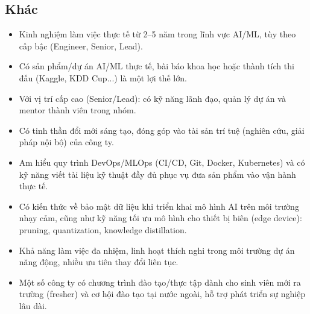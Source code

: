 \subsection{Khác}
\begin{itemize}
    \item Kinh nghiệm làm việc thực tế từ 2--5 năm trong lĩnh vực AI/ML, tùy theo cấp bậc (Engineer, Senior, Lead).
    \item Có sản phẩm/dự án AI/ML thực tế, bài báo khoa học hoặc thành tích thi đấu (Kaggle, KDD Cup...) là một lợi thế lớn.
    \item Với vị trí cấp cao (Senior/Lead): có kỹ năng lãnh đạo, quản lý dự án và mentor thành viên trong nhóm.
    \item Có tinh thần đổi mới sáng tạo, đóng góp vào tài sản trí tuệ (nghiên cứu, giải pháp nội bộ) của công ty.
    \item Am hiểu quy trình DevOps/MLOps (CI/CD, Git, Docker, Kubernetes) và có kỹ năng viết tài liệu kỹ thuật đầy đủ phục vụ đưa sản phẩm vào vận hành thực tế.
    \item Có kiến thức về bảo mật dữ liệu khi triển khai mô hình AI trên môi trường nhạy cảm, cũng như kỹ năng tối ưu mô hình cho thiết bị biên (edge device): pruning, quantization, knowledge distillation.
    \item Khả năng làm việc đa nhiệm, linh hoạt thích nghi trong môi trường dự án năng động, nhiều ưu tiên thay đổi liên tục.
    \item Một số công ty có chương trình đào tạo/thực tập dành cho sinh viên mới ra trường (fresher) và cơ hội đào tạo tại nước ngoài, hỗ trợ phát triển sự nghiệp lâu dài.
\end{itemize}
